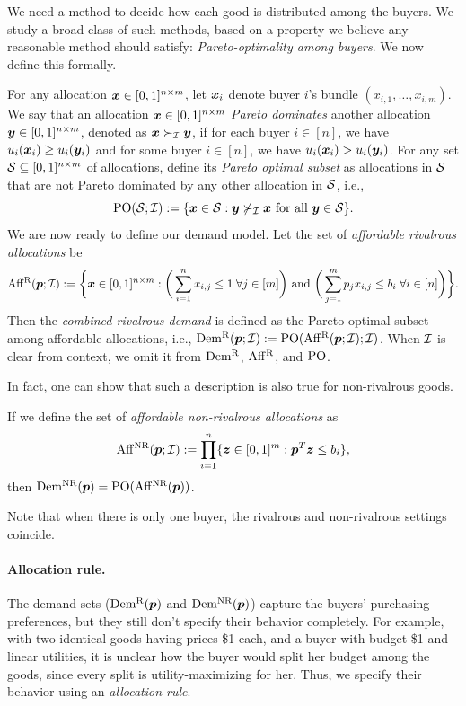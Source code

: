 We need a method to decide how each good is distributed among the buyers. We study a broad class of such methods, based on a property we believe any reasonable method should satisfy: \emph{Pareto-optimality among buyers}.
We now define this formally.

For any allocation $\bm{x} \in [0, 1]^{n \times m}$,
let $\bm{x}_i$ denote buyer $i$'s bundle $(x_{i,1}, \ldots, x_{i,m})$. We say that an allocation $\bm{x} \in [0, 1]^{n \times m}$ \emph{Pareto dominates}
another allocation $\bm{y} \in [0, 1]^{n \times m}$, denoted as $\bm{x} \succ_{\mathcal{I}} \bm{y}$, if
for each buyer $i \in [n]$, we have $u_i(\bm{x}_i) \ge u_i(\bm{y}_i)$
and for some buyer $i \in [n]$, we have $u_i(\bm{x}_i) > u_i(\bm{y}_i)$.
For any set $\mathcal{S} \subseteq [0, 1]^{n \times m}$ of allocations,
define its \emph{Pareto optimal subset} as allocations in $\mathcal{S}$ that are not Pareto dominated
by any other allocation in $\mathcal{S}$, i.e.,
\[ \operatorname{PO}(\mathcal{S}; \mathcal{I}) := \{\bm{x} \in \mathcal{S}: \bm{y} \not\succ_{\mathcal{I}} \bm{x} \text{ for all } \bm{y} \in \mathcal{S}\}. \]
%
We are now ready to define our demand model.
Let the set of \emph{affordable rivalrous allocations} be
\[ \operatorname{Aff^{\mathrm{R}}}(\bm{p}; \mathcal{I}) := \bigg\{\bm{x} \in [0, 1]^{n \times m}:
    \bigg(\sum_{i=1}^n x_{i,j} \le 1 \;\forall j \in [m]\bigg) \text{ and }
    \bigg(\sum_{j=1}^m p_jx_{i,j} \le b_i \;\forall i \in [n]\bigg)\bigg\}. \]
Then the \emph{combined rivalrous demand} is defined as
the Pareto-optimal subset among affordable allocations, i.e.,
$\operatorname{Dem^{\mathrm{R}}}(\bm{p}; \mathcal{I}) := \operatorname{PO}(\operatorname{Aff^{\mathrm{R}}}(\bm{p}; \mathcal{I}); \mathcal{I})$.
When $\mathcal{I}$ is clear from context, we omit it from $\operatorname{Dem^{\mathrm{R}}}$, $\operatorname{Aff^{\mathrm{R}}}$, and $\operatorname{PO}$.

In fact, one can show that such a description is also true for non-rivalrous goods.

\begin{observation}
If we define the set of \emph{affordable non-rivalrous allocations} as
\[ \operatorname{Aff^{\mathrm{NR}}}(\bm{p}; \mathcal{I}) := \prod_{i=1}^n \{\bm{z} \in [0, 1]^m: \bm{p}^T\bm{z} \le b_i\}, \]
then $\operatorname{Dem^{\mathrm{NR}}}(\bm{p}) = \operatorname{PO}(\operatorname{Aff^{\mathrm{NR}}}(\bm{p}))$.
\end{observation}

Note that when there is only one buyer, the rivalrous and non-rivalrous settings coincide.

\paragraph{Allocation rule.}
The demand sets ($\operatorname{Dem^{\mathrm{R}}}(\bm{p})$ and $\operatorname{Dem^{\mathrm{NR}}}(\bm{p})$) capture the buyers' purchasing preferences,
but they still don't specify their behavior completely.
For example, with two identical goods having prices \$1 each,
and a buyer with budget \$1 and linear utilities,
it is unclear how the buyer would split her budget among the goods,
since every split is utility-maximizing for her.
Thus, we specify their behavior using an \emph{allocation rule}.

